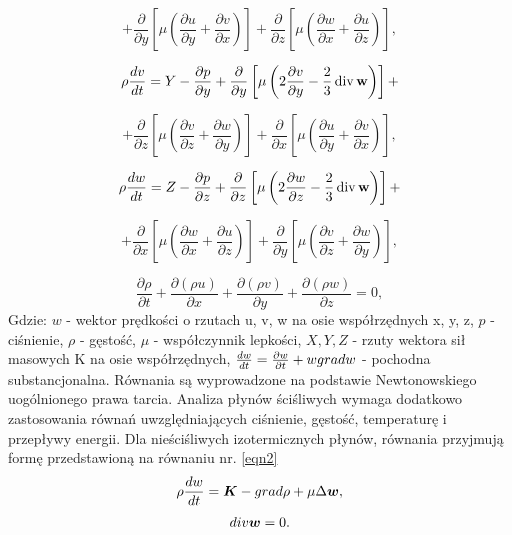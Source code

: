 \documentclass{article}
\begin{document}
$$ 
+ 
\frac \partial {\partial  y }
\left [ 
    \mu \left ( 
        \frac{\partial u }{\partial  y }
        + \frac{\partial v }{\partial  x }
    \right )  
\right ]
+ 
\frac \partial {\partial  z }
\left [ 
    \mu \left ( 
        \frac{\partial w }{\partial  x }
        + \frac{\partial u }{\partial  z }
    \right )  
\right ],
$$

$$ 
\rho 
\frac{dv }{dt }
= Y
- \frac{\partial  p }{\partial y }
+ \frac \partial {\partial  y }
\left [ 
    \mu \left ( 
        2 \frac{\partial v }{\partial  y }
        - { \frac{2}{3} }  \mathop{\rm div}  \mathbf w 
    \right )  
\right ] 
+
$$

$$ 
+ 
\frac \partial {\partial  z }
\left [ 
    \mu \left ( 
        \frac{\partial v }{\partial  z }
        + \frac{\partial w }{\partial  y }
    \right )  
\right ]
+ 
\frac \partial {\partial  x }
\left [ 
    \mu \left ( 
        \frac{\partial u }{\partial  y }
        + \frac{\partial v }{\partial  x }
    \right )  
\right ],
$$

$$ 
\rho 
\frac{dw }{dt }
= Z 
- \frac{\partial  p }{\partial z }
+ \frac \partial {\partial  z }
\left [ 
    \mu \left ( 
        2 \frac{\partial w }{\partial  z }
        - { \frac{2}{3} }  \mathop{\rm div}  \mathbf w 
    \right )  
\right ] 
+
$$

$$ 
+ 
\frac \partial {\partial  x }
\left [ 
    \mu \left ( 
        \frac{\partial w }{\partial  x }
        + \frac{\partial u }{\partial  z }
    \right )  
\right ]
+ 
\frac \partial {\partial  y }
\left [ 
    \mu \left ( 
        \frac{\partial v }{\partial  z }
        + \frac{\partial w }{\partial  y }
    \right )  
\right ],
$$

$$ 
\frac{\partial \rho }{\partial t}
+ \frac{\partial (\rho u) }{\partial x}
+ \frac{\partial (\rho v) }{\partial y}
+ \frac{\partial (\rho w) }{\partial z}
= 0,
$$
\indent
Gdzie:\newline
$w$ - wektor prędkości o rzutach u, v, w na osie współrzędnych x, y, z,\newline
$p$ - ciśnienie,\newline
$\rho$ - gęstość,\newline
$\mu$ - współczynnik lepkości,\newline
$X,Y,Z$ - rzuty wektora sił masowych K na osie współrzędnych,\newline
$\frac{dw}{dt} = \frac{\partial w}{\partial t} + w \space grad \space w$ - pochodna substancjonalna.\newline
\noindent
Równania są wyprowadzone na podstawie Newtonowskiego uogólnionego prawa tarcia.
Analiza płynów ściśliwych wymaga dodatkowo zastosowania równań uwzględniających ciśnienie, gęstość, temperaturę i przepływy energii.
Dla nieściśliwych izotermicznych płynów, równania przyjmują formę przedstawioną na równaniu nr. \ref{eqn2}\newline
\begin{equation}\label{eqn2}
\rho \frac {dw}{dt}
= \boldsymbol{K} - grad \space \rho
+ \mu \Delta \boldsymbol{w},
\end{equation}
$$
div \space \boldsymbol{w} = 0.
$$
\end{document}
